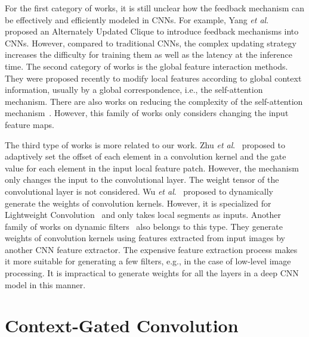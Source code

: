 \documentclass[runningheads]{llncs}
\newcommand{\etal}{\textit{et al}.}
\begin{document}
For the first category of works, it is still unclear how the feedback mechanism can be effectively and efficiently modeled in CNNs. For example, Yang \etal~\cite{yang2018convolutional} proposed an Alternately Updated Clique to introduce feedback mechanisms into CNNs. However, compared to traditional CNNs, the complex updating strategy increases the difficulty for training them as well as the latency at the inference time. The second category of works is the global feature interaction methods. They \cite{vaswani2017attention,wang2017residual,wang2017non,park2018bam,hu2018squeeze,woo2018cbam,chen2019graph,cao2019gcnet,bello2019attention} were proposed recently to modify local features according to global context information, usually by a global correspondence, i.e., the self-attention mechanism. There are also works on reducing the complexity of the self-attention mechanism~\cite{parmar2018image,child2019generating}. However, this family of works only considers changing the input feature maps. 

The third type of works is more related to our work. Zhu \etal~\cite{zhu2019deformable} proposed to adaptively set the offset of each element in a convolution kernel and the gate value for each element in the input local feature patch. However, the mechanism only changes the input to the convolutional layer. The weight tensor of the convolutional layer is not considered. Wu \etal~\cite{wu2019pay} proposed to dynamically generate the weights of convolution kernels. However, it is specialized for Lightweight Convolution~\cite{wu2019pay} and only takes local segments as inputs. Another family of works on dynamic filters~\cite{jia2016dynamic,jo2018deep,mildenhall2018burst} also belongs to this type. They generate weights of convolution kernels using features extracted from input images by another CNN feature extractor. The expensive feature extraction process makes it more suitable for generating a few filters, e.g., in the case of low-level image processing. It is impractical to generate weights for all the layers in a deep CNN model in this manner.



\section{Context-Gated Convolution}
\end{document}
